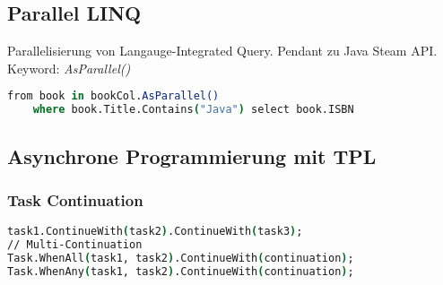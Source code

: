 \subsection{Parallel LINQ}
Parallelisierung von Langauge-Integrated Query. Pendant zu Java Steam API.
Keyword: \textit{AsParallel()}
\begin{lstlisting}[language=csh]
from book in bookCol.AsParallel()
    where book.Title.Contains("Java") select book.ISBN
\end{lstlisting}

\subsection{Asynchrone Programmierung mit TPL}
\subsubsection{Task Continuation}
\begin{lstlisting}[language=csh]
task1.ContinueWith(task2).ContinueWith(task3);
// Multi-Continuation
Task.WhenAll(task1, task2).ContinueWith(continuation);
Task.WhenAny(task1, task2).ContinueWith(continuation);
\end{lstlisting}

